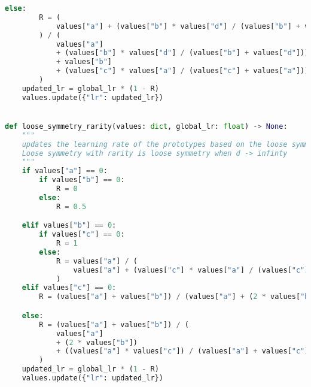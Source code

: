 \begin{lstlisting}[language=Python]
    else:
        R = (
            values["a"] + (values["b"] * values["d"] / (values["b"] + values["d"]))
        ) / (
            values["a"]
            + (values["b"] * values["d"] / (values["b"] + values["d"]))
            + values["b"]
            + (values["c"] * values["a"] / (values["c"] + values["a"]))
        )
    updated_lr = global_lr * (1 - R)
    values.update({"lr": updated_lr})


def loose_symmetry_rarity(values: dict, global_lr: float) -> None:
    """
    updates the learning rate of the prototypes based on the loose symmetry with rarity
    Loose symmetry with rarity is loose symmetry when d -> infinty
    """
    if values["a"] == 0:
        if values["b"] == 0:
            R = 0
        else:
            R = 0.5

    elif values["b"] == 0:
        if values["c"] == 0:
            R = 1
        else:
            R = values["a"] / (
                values["a"] + (values["c"] * values["a"] / (values["c"] + values["a"]))
            )
    elif values["c"] == 0:
        R = (values["a"] + values["b"]) / (values["a"] + (2 * values["b"]))

    else:
        R = (values["a"] + values["b"]) / (
            values["a"]
            + (2 * values["b"])
            + ((values["a"] * values["c"]) / (values["a"] + values["c"]))
        )
    updated_lr = global_lr * (1 - R)
    values.update({"lr": updated_lr})

\end{lstlisting}